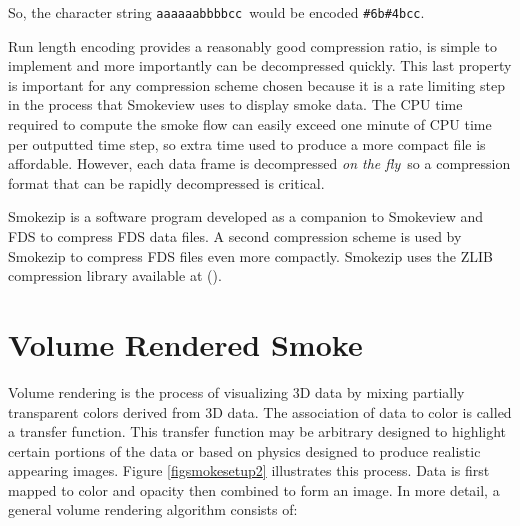 So, the character string {\tt aaaaaabbbbcc}\ would be encoded {\tt \#6b\#4bcc}.

Run length encoding provides a reasonably good compression ratio, is simple to implement and more importantly can be decompressed quickly. This last property is important for any compression
scheme chosen because it is a rate limiting step in the process that Smokeview uses to display smoke data. The CPU time required to compute the smoke flow can easily exceed one minute of CPU time
per outputted time step, so extra time used to produce a more compact file is affordable. However, each data frame is decompressed {\em on the fly}\ so a compression format that can be
rapidly decompressed is critical.

Smokezip is a software program developed as a companion to Smokeview and FDS to compress FDS data files. A second compression scheme is used by Smokezip to compress FDS files even more
compactly.  Smokezip uses the ZLIB compression library available at ().

%
%

\section{Volume Rendered Smoke}
Volume rendering is the process of visualizing 3D data by mixing partially transparent colors derived from 3D data.  The association of data to color is called a transfer function.  This transfer function may be arbitrary designed to highlight certain portions of the data or based on physics designed to produce realistic appearing images.  Figure \ref{figsmokesetup2} illustrates this process.  Data is first mapped to color and opacity then combined to form an image.  In more detail, a general volume rendering algorithm consists of:

